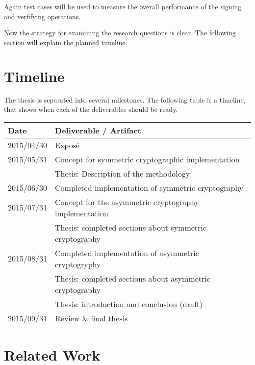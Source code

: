 \documentclass[a4paper,12pt]{article}
\begin{document}
Again test cases will be used to measure the overall performance of the signing and verfifying operations.

Now the strategy for examining the research questions is clear. The following section will explain the planned timeline.

\section{Timeline}

The thesis is separated into several milestones. The following table is a timeline, that shows when each of the deliverables should be ready.

\begin{table}[h]
\begin{tabular}{ll}
\textbf{Date} & \textbf{Deliverable / Artifact}                                           \\ \hline
2015/04/30    & Exposé                                                                    \\ \hline
2015/05/31    & Concept for symmetric cryptographic implementation                        \\
              & Thesis: Description of the methodology                                    \\ \hline
2015/06/30    & Completed implementation of symmetric cryptography                        \\ \hline
2015/07/31    & Concept for the asymmetric cryptography implementation                    \\
              & Thesis: completed sections about symmetric cryptography                   \\ \hline
2015/08/31    & Completed implementation of asymmetric cryptogryphy                       \\
              & Thesis: completed sections about asymmetric cryptography                  \\
              & Thesis: introduction and conclusion (draft)                               \\ \hline
2015/09/31    & Review \& final thesis                                                   
\end{tabular}
\end{table}

\section{Related Work}

\begingroup
\renewcommand{\section}[2]{}
\renewcommand{\refname}{}
\nocite{*}


\endgroup
\end{document}
